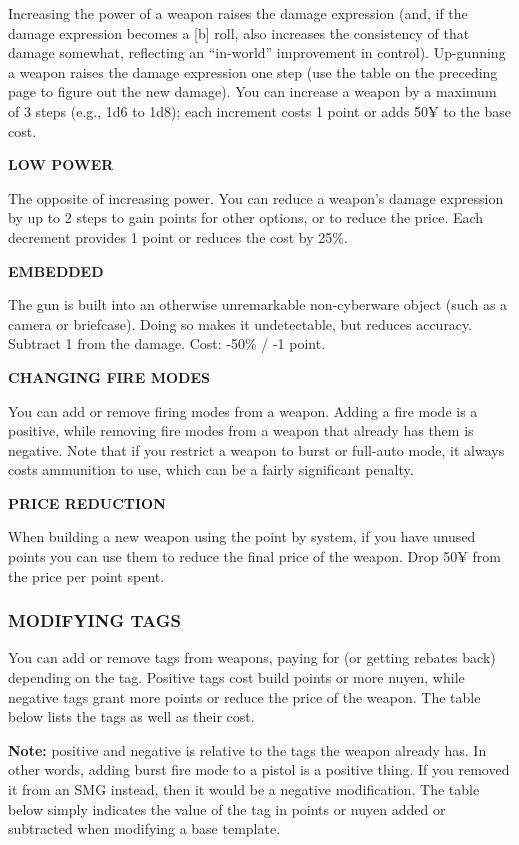 \documentclass[oneside,10pt]{article}
\begin{document}
\begin{multicols}{2}
Increasing the power of a weapon raises the damage expression (and, if the damage expression becomes a [b] roll,
also increases the consistency of that damage somewhat, reflecting an ``in-world'' improvement in control). Up-gunning
a weapon raises the damage expression one step (use the
table on the preceding page to figure out the new damage).
You can increase a weapon by a maximum of 3 steps (e.g.,
1d6 to 1d8); each increment costs 1 point or adds 50¥ to the
base cost.

\textbf{LOW POWER}

The opposite of increasing power. You can reduce a weapon’s
damage expression by up to 2 steps to gain points for other
options, or to reduce the price. Each decrement provides 1
point or reduces the cost by 25\%.

\textbf{EMBEDDED}

The gun is built into an otherwise unremarkable non-cyberware object (such as a camera or briefcase). Doing so makes
it undetectable, but reduces accuracy. Subtract 1 from the
damage. Cost: -50\% / -1 point.

\textbf{CHANGING FIRE MODES}

You can add or remove firing modes from a weapon. Adding
a fire mode is a positive, while removing fire modes from a
weapon that already has them is negative. Note that if you
restrict a weapon to burst or full-auto mode, it always costs
ammunition to use, which can be a fairly significant penalty.

\textbf{PRICE REDUCTION}

When building a new weapon using the point by system, if
you have unused points you can use them to reduce the final
price of the weapon. Drop 50¥ from the price per point spent.

\subsubsection{MODIFYING TAGS}
You can add or remove tags from weapons, paying for (or
getting rebates back) depending on the tag. Positive tags cost
build points or more nuyen, while negative tags grant more
points or reduce the price of the weapon. The table below
lists the tags as well as their cost.

\textbf{Note:} positive and negative is relative to the tags the weapon already has. In other words, adding burst fire mode to
a pistol is a positive thing. If you removed it from an SMG
instead, then it would be a negative modification. The table
below simply indicates the value of the tag in points or nuyen added or subtracted when modifying a base template.


\end{multicols}
\end{document}
